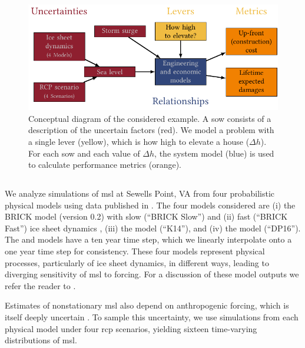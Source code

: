 \documentclass[11pt]{article}
\begin{document}
\begin{figure}
    \centering
    \includegraphics[width=\textwidth]{xlrm.pdf}
    \caption{
        Conceptual diagram of the considered example.
        A \acrfull{sow} consists of a description of the uncertain factors (red).
        We model a problem with a single lever (yellow), which is how high to elevate a house ($\Delta h$).
        For each \acrshort{sow} and each value of $\Delta h$, the system model (blue) is used to calculate performance metrics (orange).
    }\label{fig:xlrm}
\end{figure}

\subsection{}\label{sec:case-slr}

We analyze simulations of \gls{msl} at Sewells Point, VA from four probabilistic physical models using data published in \citet{ruckert_coastal:2019}.
The four models considered are (i) the BRICK model (version 0.2) with slow (``BRICK Slow'') and (ii) fast (``BRICK Fast'') ice sheet dynamics \citep{wong_brick0.2:2017}, (iii) the \citet{kopp_probabilistic:2014} model (``K14''), and (iv) the \citet{deconto_antarctica:2016} model (``DP16'').
The \citet{kopp_probabilistic:2014} and \citet{deconto_antarctica:2016} models have a ten year time step, which we linearly interpolate onto a one year time step for consistency.
These four models represent physical processes, particularly of ice sheet dynamics, in different ways, leading to diverging sensitivity of \gls{msl} to forcing.
For a discussion of these model outputs we refer the reader to \citet{ruckert_coastal:2019}.

Estimates of nonstationary \gls{msl} also depend on anthropogenic forcing, which is itself deeply uncertain \citep{ho_scenarios:2019,srikrishnan_probabilistic:2022}.
To sample this uncertainty, we use simulations from each physical model under four \gls{rcp} scenarios, yielding sixteen time-varying distributions of \gls{msl}.
\end{document}
